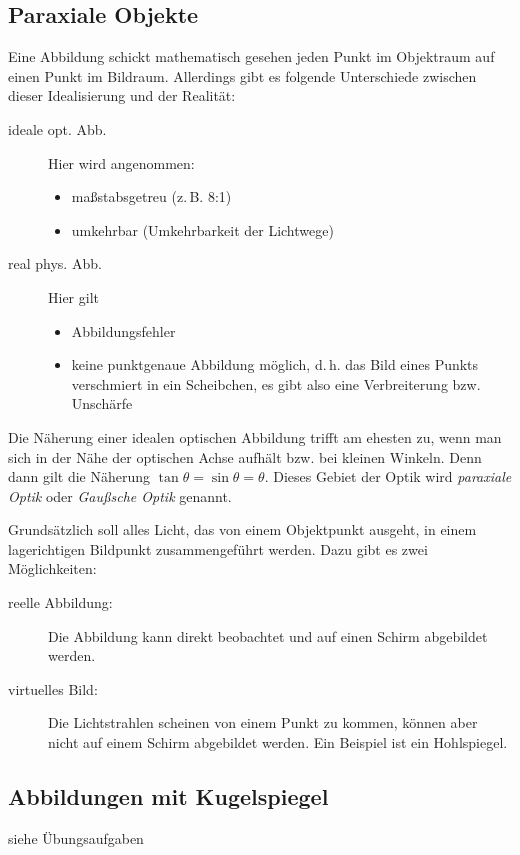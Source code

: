 \subsection{Paraxiale Objekte}
Eine Abbildung schickt mathematisch gesehen jeden Punkt im Objektraum
auf einen Punkt im Bildraum. Allerdings gibt es folgende Unterschiede
zwischen dieser Idealisierung und der Realität:
\begin{description}
\item[ideale opt. Abb.] Hier wird angenommen:
  \begin{itemize}
  \item maßstabsgetreu (z.\,B. 8:1)
  \item umkehrbar (Umkehrbarkeit der Lichtwege)
  \end{itemize}
\item[real phys. Abb.] Hier gilt
  \begin{itemize}
  \item Abbildungsfehler
  \item keine punktgenaue Abbildung möglich, d.\,h. das Bild eines
    Punkts verschmiert in ein Scheibchen, es gibt also eine
    Verbreiterung bzw. Unschärfe
  \end{itemize}
\end{description}
Die Näherung einer idealen optischen Abbildung trifft am ehesten zu,
wenn man sich in der Nähe der optischen Achse aufhält bzw. bei kleinen
Winkeln. Denn dann gilt die Näherung $\tan\theta=\sin\theta=\theta$.
Dieses Gebiet der Optik wird \emph{paraxiale Optik} oder \emph{Gaußsche Optik} genannt.

Grundsätzlich soll alles Licht, das von einem Objektpunkt ausgeht, in
einem lagerichtigen Bildpunkt zusammengeführt werden.
Dazu gibt es zwei Möglichkeiten:
\begin{description}
\item[reelle Abbildung:] Die Abbildung kann direkt beobachtet und auf
  einen Schirm abgebildet werden.
\item[virtuelles Bild:] Die Lichtstrahlen scheinen von einem Punkt zu
  kommen, können aber nicht auf einem Schirm abgebildet werden.
  Ein Beispiel ist ein Hohlspiegel.
\end{description}


\subsection{Abbildungen mit Kugelspiegel}
siehe Übungsaufgaben

